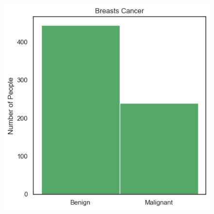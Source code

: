 \documentclass[conference]{IEEEtran}
\begin{document}
\begin{figure}
{\includegraphics[scale = 0.39]{figs/histograms/BREAST_CANCER_DIAGNOSIS.png}} \\
%
\hspace{8pt}%

\end{figure}
\end{document}
